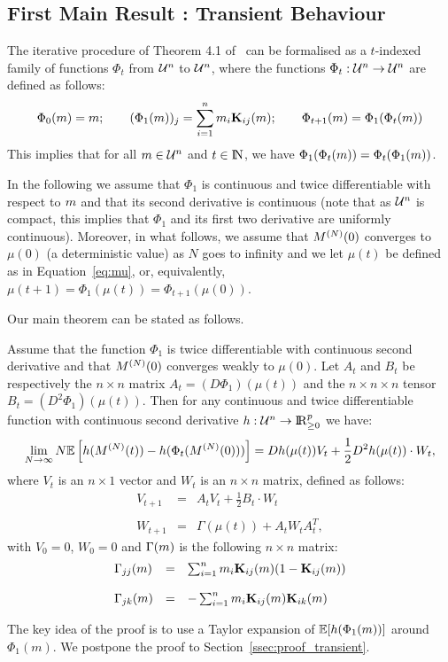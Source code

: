 \documentclass{amsart}
\begin{document}
\subsection{First Main Result : Transient Behaviour}

The iterative procedure of Theorem 4.1 of~\cite{Le+07}  can be
formalised as a $t$-indexed family of functions $\Phi_t$ from
$\mathcal{U}^n$ to $\mathcal{U}^n$, where the functions
$\Phi_t: \mathcal{U}^n \rightarrow \mathcal{U}^n$ are defined as follows:
\begin{align*}
  \Phi_{0}(m) = m; \qquad {\displaystyle (\Phi_1(m))_j =
  \sum_{i=1}^n m_i \mathbf{K}_{ij}(m)};
  \qquad \Phi_{t+1}(m) = \Phi_1(\Phi_t(m))
\end{align*}
This implies that for all $m \in \mathcal{U}^n$ and $t \in \mathrm{I\!N}$, we
have $\Phi_1(\Phi_t(m))= \Phi_t(\Phi_1(m))$.

In the following we assume that $\Phi_{1}$ is continuous and twice
differentiable with respect to $m$ and that its second derivative
is continuous (note that as $\mathcal{U}^n$ is compact, this implies that
$\Phi_1$ and its first two derivative are uniformly continuous).
Moreover, in what follows, we assume that $M^{(N)}(0)$ converges to
$\mu(0)$ (a deterministic value) as $N$ goes to infinity and we let
$\mu(t)$ be defined as in Equation~\eqref{eq:mu}, or, equivalently,
$\mu(t+1)=\Phi_1(\mu(t))=\Phi_{t+1}(\mu(0))$.

Our main theorem can be stated as follows. 
\begin{theorem}\label{theo:main}
  Assume that the function $\Phi_1$ is twice differentiable with
  continuous second derivative and that $M^{(N)}(0)$ converges weakly to
  $\mu(0)$. Let $A_t$ and $B_t$ be respectively the $n \times n$
  matrix $A_t = (D \Phi_1)(\mu(t))$ and the $n \times n \times n$
  tensor $B_t = (D^2 \Phi_1)(\mu(t))$.  Then for any continuous and
  twice differentiable function with continuous second derivative
  $h:\mathcal{U}^n \rightarrow \mathrm{I\!R}_{\geq 0}^p$ we have:
$$
\lim_{N\rightarrow \infty} N\esp{h(\vt{M}\aN(t))- h(\Phi_t(\vt{M}\aN(0)))} =
Dh(\mu(t)) V_t + \frac{1}{2}D^2h(\mu(t))\cdot W_t,
$$
where $V_t$ is an $n \times 1$ vector and $W_t$ is an $n \times n$ matrix, defined as follows:
$$
\begin{array}{lcl}
V_{t+1} & = & A_tV_t + \frac{1}{2}B_t \cdot W_t\\\\
W_{t+1} & = & \Gamma(\mu(t)) + A_t W_t A_t^T,
\end{array}
$$
with $V_0=0$, $W_0 = 0$ and $\Gamma(m)$ is the following
$n \times n$ matrix:
$$
\begin{array}{lcl}
\Gamma_{jj}(m) & = &  \sum_{i=1}^n m_i \mathbf{K}_{ij}(m)(1-\mathbf{K}_{ij}(m))\\\\
\Gamma_{jk}(m) & = & -\sum_{i=1}^n m_i \mathbf{K}_{ij}(m)\mathbf{K}_{ik}(m)
\end{array}
$$

\end{theorem}
The key idea of the proof is to use a Taylor expansion of
$\esp{h(\Phi_1(m))}$ around $\Phi_1(m)$.  We postpone the proof to
Section~\ref{ssec:proof_transient}.
\end{document}
